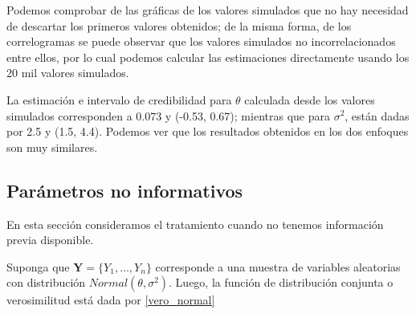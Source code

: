 \begin{Eje}
\begin{knitrout}
\end{knitrout}

Podemos comprobar de las gráficas de los valores simulados que no hay necesidad de descartar los primeros valores obtenidos; de la misma forma, de los correlogramas se puede observar que los valores simulados no incorrelacionados entre ellos, por lo cual podemos calcular las estimaciones directamente usando los 20 mil valores simulados. 

La estimación e intervalo de credibilidad para $\theta$ calculada desde los valores simulados corresponden a 0.073 y (-0.53, 0.67); mientras que para $\sigma^2$, están dadas por 2.5 y (1.5, 4.4). Podemos ver que los resultados obtenidos en los dos enfoques son muy similares.
\end{Eje}

\subsection{Parámetros no informativos}
En esta sección consideramos el tratamiento cuando no tenemos información previa disponible.

Suponga que $\mathbf{Y}=\{Y_1,\ldots,Y_n\}$ corresponde a una muestra de variables aleatorias con distribución $Normal(\theta,\sigma^2)$. Luego, la función de distribución conjunta o verosimilitud está dada por \ref{vero_normal}

